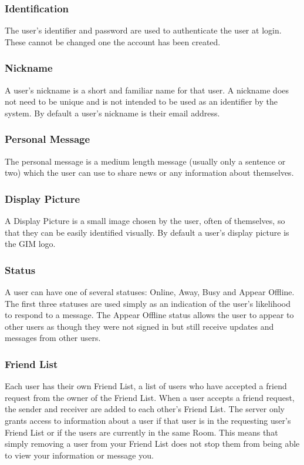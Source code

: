 \subsubsection{Identification}
The user's identifier and password are used to authenticate the user at login. These cannot be changed one the account has been created. 

\subsubsection{Nickname}
A user's nickname is a short and familiar name for that user. A nickname does not need to be unique and is not intended to be used as an identifier by the system. By default a user's nickname is their email address.

\subsubsection{Personal Message}
The personal message is a medium length message (usually only a sentence or two) which the user can use to share news or any information about themselves.

\subsubsection{Display Picture}
A Display Picture is a small image chosen by the user, often of themselves, so that they can be easily identified visually. By default a user's display picture is the GIM logo. 

\subsubsection{Status}
A user can have one of several statuses: Online, Away, Busy and Appear Offline. The first three statuses are used simply as an indication of the user's likelihood to respond to a message. The Appear Offline status allows the user to appear to other users as though they were not signed in but still receive updates and messages from other users.

\subsubsection{Friend List}
Each user has their own Friend List, a list of users who have accepted a friend request from the owner of the Friend List. When a user accepts a friend request, the sender and receiver are added to each other's Friend List. The server only grants access to information about a user if that user is in the requesting user's Friend List or if the users are currently in the same Room. This means that simply removing a user from your Friend List does not stop them from being able to view your information or message you.


